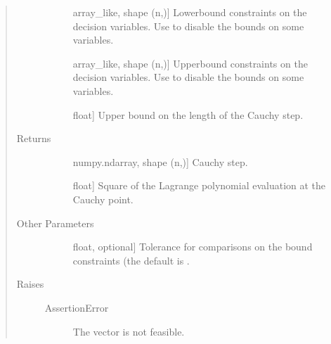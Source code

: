 \documentclass[letterpaper,10pt,english]{sphinxmanual}
\begin{document}
\begin{fulllineitems}
\begin{quote}
\begin{description}
\begin{description}
\item[{}] \leavevmode{[}array\_like, shape (n,){]}
\sphinxAtStartPar
Lower\sphinxhyphen{}bound constraints on the decision variables. Use  to
disable the bounds on some variables.

\item[{}] \leavevmode{[}array\_like, shape (n,){]}
\sphinxAtStartPar
Upper\sphinxhyphen{}bound constraints on the decision variables. Use  to
disable the bounds on some variables.

\item[{}] \leavevmode{[}float{]}
\sphinxAtStartPar
Upper bound on the length of the Cauchy step.

\end{description}

\item[{Returns}] \leavevmode\begin{description}
\item[{}] \leavevmode{[}numpy.ndarray, shape (n,){]}
\sphinxAtStartPar
Cauchy step.

\item[{}] \leavevmode{[}float{]}
\sphinxAtStartPar
Square of the Lagrange polynomial evaluation at the Cauchy point.

\end{description}

\item[{Other Parameters}] \leavevmode\begin{description}
\item[{}] \leavevmode{[}float, optional{]}
\sphinxAtStartPar
Tolerance for comparisons on the bound constraints (the default is
.

\end{description}

\item[{Raises}] \leavevmode\begin{description}
\item[{AssertionError}] \leavevmode
\sphinxAtStartPar
The vector  is not feasible.

\end{description}

\end{description}\end{quote}



\end{fulllineitems}
\end{document}
